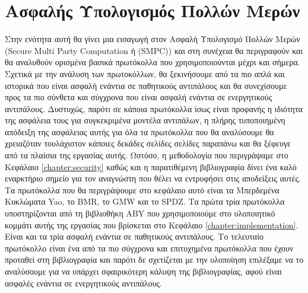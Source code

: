 \chapter{Ασφαλής Υπολογισμός Πολλών Μερών}
\label{chapter:SMPC}

Στην ενότητα αυτή θα γίνει μια εισαγωγή στον Ασφαλή Υπολογισμό Πολλών Μερών (Secure Multi Party Computation ή (SMPC)) και στη συνέχεια θα περιγραφούν και θα αναλυθούν ορισμένα βασικά πρωτόκολλα που χρησιμοποιούνται μέχρι και σήμερα. Σχετικά με την ανάλυση των πρωτοκόλλων, θα ξεκινήσουμε από τα πιο απλά και ιστορικά που είναι ασφαλή ενάντια σε παθητικούς αντιπάλους και θα συνεχίσουμε προς τα πιο σύνθετα και σύγχρονα που είναι ασφαλή ενάντια σε ενεργητικούς αντιπάλους. Δυστυχώς, παρότι σε κάποια πρωτόκολλα ίσως είναι προφανής η ιδιότητα της ασφάλεια τους για συγκεκριμένα μοντέλα αντιπάλων, η πλήρης τυποποιημένη απόδειξη της ασφάλειας αυτής για όλα τα πρωτόκολλα που θα αναλύσουμε θα χρειαζόταν τουλάχιστον κάποιες δεκάδες σελίδες σελίδες παραπάνω και θα ξέφευγε από τα πλαίσια της εργασίας αυτής. Ωστόσο, η μεθοδολογία που περιγράψαμε στο Κεφάλαιο \ref{chapter:security} καθώς και η παρατιθέμενη βιβλιογραφία δίνει ένα καλό εναρκτήριο σημείο για τον αναγνώστη που θέλει να εντρυφήσει στις αποδείξεις αυτές. Τα πρωτόκολλα που θα περιγράψουμε στο κεφάλαιο αυτό είναι τα Μπερδεμένα Κυκλώματα Yao, το BMR, το GMW και το SPDZ. Τα πρώτα τρία πρωτόκολλα υποστηρίζονται από τη βιβλιοθήκη ABY που χρησιμοποιούμε στο υλοποιητικό κομμάτι αυτής της εργασίας που βρίσκεται στο Κεφάλαιο \ref{chapter:implementation}. Είναι και τα τρία ασφαλή ενάντια σε παθητικούς αντιπάλους. Το τελευταίο πρωτόκολλο είναι ένα από τα πιο σύγχρονα και επιτυχημένα πρωτόκολλα που έχουν προταθεί στη βιβλιογραφία και παρότι δε σχετίζεται με την υλοποίηση επιλέξαμε να το αναλύσουμε για να υπάρχει σφαιρικότερη κάλυψη της βιβλιογραφίας, αφού είναι ασφαλές ενάντια σε ενεργητικούς αντιπάλους.

